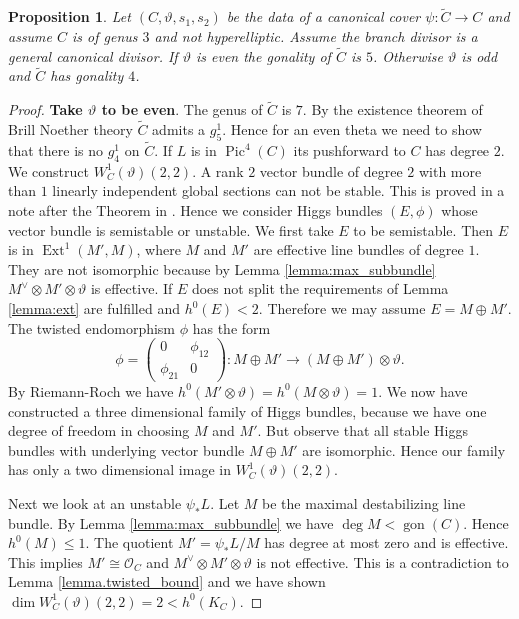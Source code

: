 \documentclass[12pt]{extarticle}
\newtheorem{proposition}[theorem]{Proposition}
\theoremstyle{definition}
\numberwithin{theorem}{section}
\newcommand{\OO}{\mathcal{O}}
\newcommand{\op}{\operatorname}
\renewcommand{\tilde}{\widetilde}		%
\begin{document}
\begin{proposition}\label{prop:g=3}
Let $(C,\vartheta,s_1,s_2)$ be the data of a canonical cover $\psi: \tilde{C} \rightarrow C$ and assume $C$ is of genus $3$ and not hyperelliptic. Assume the branch divisor is a general canonical divisor. If $\vartheta$ is even the gonality of $\tilde{C}$ is $5$. Otherwise $\vartheta$ is odd and $\tilde{C}$ has gonality $4$.  
\end{proposition}
\begin{proof}
\textbf{Take $\vartheta$ to be even}. The genus of $\tilde{C}$ is $7$. By the existence theorem of Brill Noether theory $\tilde{C}$ admits a $g^1_5$. Hence for an even theta we need to show that there is no $g^1_4$ on $\tilde{C}$. If $L$ is in $\op{Pic}^4(C)$ its pushforward to $C$ has degree $2$. We construct $W^1_C(\vartheta)(2,2)$. A rank $2$ vector bundle of degree $2$ with more than $1$ linearly independent global sections can not be stable. This is proved in a note after the Theorem in \cite{Teixidor}. Hence we consider Higgs bundles  $(E, \phi)$ whose vector bundle is semistable or unstable. We first take $E$ to be semistable. Then $E$ is in $\op{Ext}^1(M',M)$, where $M$ and $M'$ are effective line bundles of degree $1$. They are not isomorphic because by Lemma \ref{lemma:max_subbundle} $M^\vee \otimes M' \otimes \vartheta$ is effective. If $E$ does not split the requirements of Lemma \ref{lemma:ext} are fulfilled and $h^0(E) < 2$. Therefore we may assume $E = M \oplus M'$. The twisted endomorphism $\phi$ has the form
\begin{equation*}
\phi = \begin{pmatrix}
0 & \phi_{12} \\
\phi_{21} & 0 
\end{pmatrix}: M \oplus M' \rightarrow (M  \oplus M') \otimes \vartheta.
\end{equation*}
By Riemann-Roch we have $h^0(M'\otimes \vartheta) = h^0(M\otimes \vartheta) = 1$. We now have constructed a three dimensional family of Higgs bundles, because we have one degree of freedom in choosing $M$ and $M'$. But observe that all stable Higgs bundles with underlying vector bundle $M\oplus M'$ are isomorphic. Hence our family has only a two dimensional image in $W^1_C(\vartheta)(2,2)$.

Next we look at an unstable $\psi_*L$. Let $M$ be the maximal destabilizing line bundle. By Lemma \ref{lemma:max_subbundle} we have $\deg M < \op{gon}(C)$. Hence $h^0(M) \leq 1$. The quotient $M' = \psi_*L/M$ has degree at most zero and is effective. This implies $M' \cong \OO_C$ and $M^\vee \otimes M' \otimes \vartheta$ is not effective. This is a contradiction to Lemma \ref{lemma.twisted_bound} and we have shown $\dim W^1_C(\vartheta)(2,2) = 2 < h^0(K_C)$.
\medskip


\end{proof}
\end{document}
